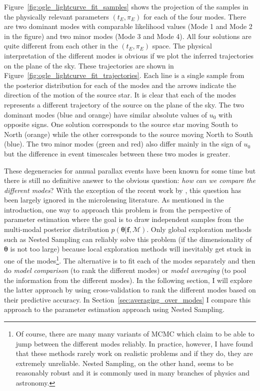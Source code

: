 \documentclass[12pt,dvipsnames]{report}
\renewcommand{\vec}[1]{\boldsymbol{\mathbf{#1}}}
\begin{document}
Figure~\ref{fig:ogle_lightcurve_fit_samples} shows the projection of the samples 
in the physically relevant parameters $(t_E, \pi_E)$ for each of the four modes.
There are two dominant modes with comparable likelihood values (Mode 1 and 
Mode 2 in the figure) and two minor modes (Mode 3 and Mode 4). All four solutions are 
quite different from each other in the $(t_E, \pi_E)$ space. 
The physical interpretation of the different modes
is obvious if we plot the inferred trajectories on the plane of the sky. These trajectories
are shown in Figure~\ref{fig:ogle_lightcurve_fit_trajectories}. Each line is a single 
sample from the posterior distribution for each of the modes and the arrows 
indicate the direction of the motion of the source star. It is clear that each of the modes
represents a different trajectory of the source on the plane of the sky. The two 
dominant modes (blue and orange) have similar absolute values of $u_0$  with opposite 
signs. One solution corresponds to the source star moving 
South to North (orange) while the other corresponds to the source moving North to South (blue).
The two minor modes (green and red) also differ mainly in the sign of $u_0$
but the difference in event timescales between these two modes is greater.

These degeneracies for annual parallax events have been known for some time 
\citep{2004ApJ...606..319G} but there is still no definitive answer to the obvious 
question: \emph{how can we compare the different modes}?
With the exception of the recent work by \citet{2022MNRAS.514.4845K}, this question has
been largely ignored in the microlensing literature. As mentioned in the introduction, one 
way to approach this problem is from the perspective of parameter estimation 
where the goal is to draw independent samples from the multi-modal posterior 
distribution $p(\vec\theta|\vec f, \mathcal{M})$. Only global exploration methods 
such as Nested Sampling can reliably solve this problem (if the dimensionality 
of $\vec\theta$ is not too large) because local exploration methods will inevitably
get stuck in one of the modes\footnote{
    Of course, there are many many variants of MCMC which claim to be able to jump
    between the different modes reliably. In practice, however, I have found that 
    these methods rarely work on realistic problems and if they do, they are extremely 
    unreliable. Nested Sampling, on the other hand, seems to be reasonably robust and 
    it is commonly used in many branches of physics and astronomy.
}.
The alternative is to fit each of the modes separately and then do 
\emph{model comparison} (to rank the different modes) or \emph{model averaging}
(to pool the information from the different modes). In the following section, I will 
explore the latter approach by using cross-validation to rank the different modes
based on their predictive accuracy.
In Section~\ref{sec:averaging_over_modes} I compare this approach to the parameter 
estimation approach using Nested Sampling.
\end{document}
